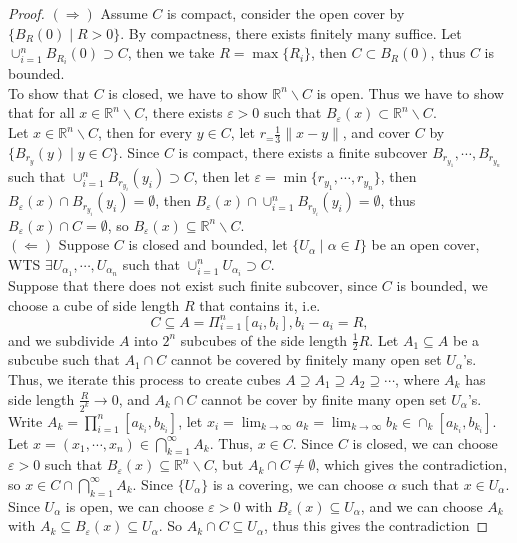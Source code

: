 \documentclass[11pt]{article}
\theoremstyle{quiet}
\theoremstyle{quietremark}
\begin{document}
\begin{proof}
$(\Rightarrow)$ 
Assume $C$ is compact, consider the open cover by $\{B_R(0)\mid R>0\}$. By compactness, there exists finitely many suffice. Let $\cup_{i=1}^n B_{R_i}(0)\supset C$, then we take $R=\max\{R_i\}$, then $C\subset B_{R}(0)$, thus $C$ is bounded.\\
To show that $C$ is closed, we have to show $\mathbb{R}^n\backslash C$ is open. Thus we have to show that for all $x\in\mathbb{R}^n\backslash C$, there exists $\varepsilon>0$ such that $B_\varepsilon(x)\subset\mathbb{R}^n\backslash C$. \\
Let $x\in\mathbb{R}^n\backslash C$, then for every $y\in C$, let $r_=\frac{1}{3}\|x-y\|$, and cover $C$ by $\{B_{r_y}(y)\mid y\in C\}$. Since $C$ is compact, there exists a finite subcover $B_{r_{y_{1}}},\cdots,B_{r_{y_{n}}}$ such that $\cup_{i=1}^n B_{r_{y_i}}(y_i)\supset C$, then let $\varepsilon=\min\{r_{y_1},\cdots,r_{y_n}\}$, then $B_\varepsilon(x)\cap B_{r_{y_i}}(y_i)=\emptyset$, then $B_\varepsilon(x)\cap \cup_{i=1}^n B_{r_{y_i}}(y_i)=\emptyset$, thus $B_\varepsilon(x)\cap C=\emptyset$, so $B_\varepsilon(x)\subseteq\mathbb{R}^n\backslash C$.\\

$(\Leftarrow)$
Suppose $C$ is closed and bounded, let $\{U_\alpha\mid \alpha\in I\}$ be an open cover, WTS $\exists U_{\alpha_1},\cdots,U_{\alpha_n}$ such that $\cup_{i=1}^nU_{\alpha_i}\supset C$.\\
Suppose that there does not exist such finite subcover, since $C$ is bounded, we choose a cube of side length $R$ that contains it, i.e.
\[
C\subseteq A=\Pi_{i=1}^n[a_i,b_i], b_i-a_i=R,
\]
and we subdivide $A$ into $2^n$ subcubes of the side length $\frac{1}{2}R$. Let $A_1\subseteq A$ be a subcube such that $A_1\cap C$ cannot be covered by finitely many open set $U_\alpha$'s.
Thus, we iterate this process to create cubes $A\supseteq A_1\supseteq A_2\supseteq\cdots$, where $A_k$ has side length $\frac{R}{2^k}\to 0$, and $A_k\cap C$ cannot be cover by finite many open set $U_\alpha$'s.
Write $A_k=\prod_{i=1}^n[a_{k_i},b_{k_i}]$, let $x_i=\lim_{k\to\infty}a_k=\lim_{k\to\infty}b_k\in\cap_k[a_{k_i},b_{k_i}].$
Let $x=(x_1,\cdots,x_n)\in\bigcap_{k=1}^\infty A_k$.
Thus, $x\in C$.
Since $C$ is closed, we can choose $\varepsilon>0$ such that $B_\varepsilon(x)\subseteq\mathbb{R}^n\backslash C$, but $A_k\cap C\ne\emptyset$, which gives the contradiction, so $x\in C\cap\bigcap_{k=1}^\infty A_k$.
Since $\{U_\alpha\}$ is a covering, we can choose $\alpha$ such that $x\in U_\alpha$. Since $U_\alpha$ is open, we can choose $\varepsilon>0$ with $B_\varepsilon(x)\subseteq U_\alpha$, and we can choose $A_k$ with $A_k\subseteq B_\varepsilon(x)\subseteq U_\alpha$.
So $A_k\cap C\subseteq U_\alpha$, thus this gives the contradiction

\end{proof}
\end{document}
